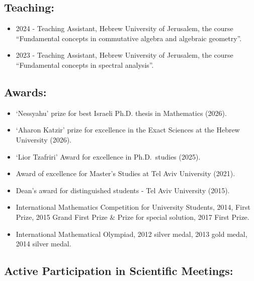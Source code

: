 \hypertarget{teaching}{%
\subsection{\texorpdfstring{\textbf{Teaching:}}{Teaching:}}\label{teaching}}

\begin{itemize}
\tightlist
\item
  2024 - Teaching Assistant, Hebrew University of Jerusalem, the course
  ``Fundamental concepts in commutative algebra and algebraic
  geometry''.
\item
  2023 - Teaching Assistant, Hebrew University of Jerusalem, the course
  ``Fundamental concepts in spectral analysis''.
\end{itemize}

\hypertarget{awards}{%
\subsection{\texorpdfstring{\textbf{Awards:}}{Awards:}}\label{awards}}

\begin{itemize}
\tightlist
\item `Nessyahu' prize for best Israeli Ph.D. thesis in Mathematics (2026). 
\item `Aharon Katzir' prize for excellence in the Exact Sciences at the Hebrew University (2026).
\item
  `Lior Tzafriri' Award for excellence in Ph.D.~studies (2025).
  \item
  Award of excellence for Master's Studies at Tel Aviv University (2021).
  \item
  Dean's award for distinguished students - Tel Aviv University (2015).
  \item
  International Mathematics Competition for University Students, 2014,
  First Prize, 2015 Grand First Prize \& Prize for special solution,
  2017 First Prize.
  \item
    International Mathematical Olympiad, 2012 silver medal, 2013 gold
    medal, 2014 silver medal.
\end{itemize}

\hypertarget{active-participation-in-scientific-meetings}{%
\subsection{\texorpdfstring{\textbf{Active Participation in Scientific
Meetings:}}{Active Participation in Scientific Meetings:}}\label{active-participation-in-scientific-meetings}}


